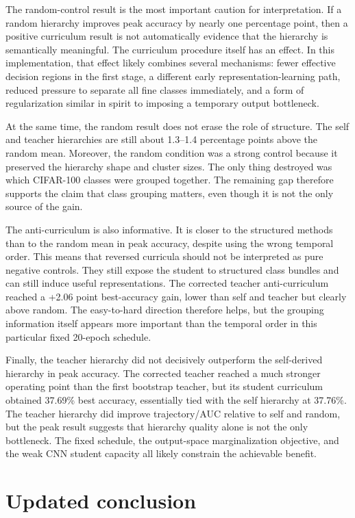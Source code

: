 The random-control result is the most important caution for interpretation. If a
random hierarchy improves peak accuracy by nearly one percentage point, then a
positive curriculum result is not automatically evidence that the hierarchy is
semantically meaningful. The curriculum procedure itself has an effect. In this
implementation, that effect likely combines several mechanisms: fewer effective
decision regions in the first stage, a different early representation-learning
path, reduced pressure to separate all fine classes immediately, and a form of
regularization similar in spirit to imposing a temporary output bottleneck.

At the same time, the random result does not erase the role of structure. The
self and teacher hierarchies are still about 1.3--1.4 percentage points above
the random mean. Moreover, the random condition was a strong control because it
preserved the hierarchy shape and cluster sizes. The only thing destroyed was
which CIFAR-100 classes were grouped together. The remaining gap therefore
supports the claim that class grouping matters, even though it is not the only
source of the gain.

The anti-curriculum is also informative. It is closer to the structured methods
than to the random mean in peak accuracy, despite using the wrong temporal order.
This means that reversed curricula should not be interpreted as pure negative
controls. They still expose the student to structured class bundles and can still
induce useful representations. The corrected teacher anti-curriculum reached a
+2.06 point best-accuracy gain, lower than self and teacher but clearly above
random. The easy-to-hard direction therefore helps, but the grouping information
itself appears more important than the temporal order in this particular fixed
20-epoch schedule.

Finally, the teacher hierarchy did not decisively outperform the self-derived
hierarchy in peak accuracy. The corrected teacher reached a much stronger operating point
than the first bootstrap teacher, but its student curriculum obtained 37.69\%
best accuracy, essentially tied with the self hierarchy at 37.76\%. The teacher
hierarchy did improve trajectory/AUC relative to self and random, but the peak
result suggests that hierarchy quality alone is not the only bottleneck. The
fixed schedule, the output-space marginalization objective, and the weak CNN
student capacity all likely constrain the achievable benefit.

\section{Updated conclusion}

